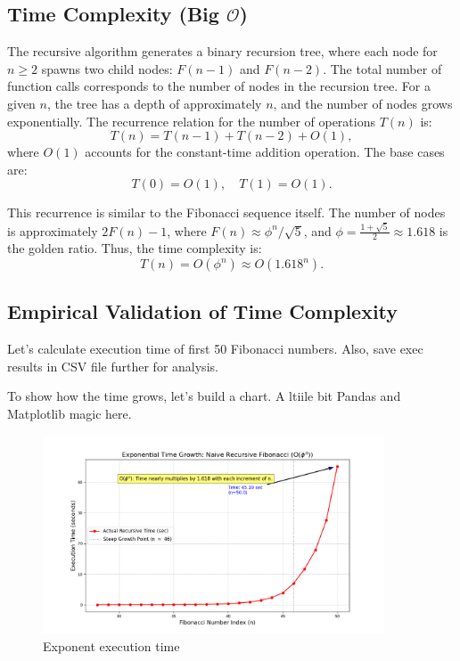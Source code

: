 \documentclass{article}
\begin{document}
\subsection{Time Complexity (Big $\mathcal{O}$)}
The recursive algorithm generates a binary recursion tree, where each node for \( n \geq 2 \) spawns two child nodes: \( F(n-1) \) and \( F(n-2) \).
The total number of function calls corresponds to the number of nodes in the recursion tree. For a given \( n \), the tree has a depth of approximately \( n \), and the number of nodes grows exponentially. The recurrence relation for the number of operations \( T(n) \) is:
\[
T(n) = T(n-1) + T(n-2) + O(1),
\]
where \( O(1) \) accounts for the constant-time addition operation. The base cases are:
\[
T(0) = O(1), \quad T(1) = O(1).
\]

This recurrence is similar to the Fibonacci sequence itself. The number of nodes is approximately \( 2F(n) - 1 \), where \( F(n) \approx \phi^n / \sqrt{5} \), and \( \phi = \frac{1 + \sqrt{5}}{2} \approx 1.618 \) is the golden ratio. Thus, the time complexity is:
\[
T(n) = O(\phi^n) \approx O(1.618^n).
\]

\subsection{Empirical Validation of Time Complexity}
Let's calculate execution time of first 50 Fibonacci numbers. Also, save exec results in CSV file further for analysis.

To show how the time grows, let's build a chart. A ltiile bit Pandas and Matplotlib magic here.
\begin{figure}[H]
	\centering
	\includegraphics[width=0.9\textwidth]{./recursive-time-exec/exponential-time-growth.png}
	\caption{Exponent execution time}
	\label{fig:exponent_growth}
\end{figure}
\end{document}

